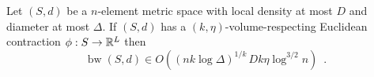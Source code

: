 \documentclass{patmorin}
\renewcommand{\ge}{\geqslant}
\renewcommand{\le}{\leqslant}
\DeclareMathOperator{\bw}{bw}
\begin{document}
\begin{thm}\label{volume_density_bandwidth}
  Let $(S,d)$ be a $n$-element metric space with local density at most $D$ and diameter at most $\Delta$.  If $(S,d)$ has a $(k,\eta)$-volume-respecting Euclidean contraction $\phi:S\to\mathbb{R}^L$
  then
  \[
    \bw(S,d) \in O((nk\log\Delta)^{1/k}\,Dk\eta\log^{3/2} n) \enspace .
  \]
\end{thm}

\end{document}
